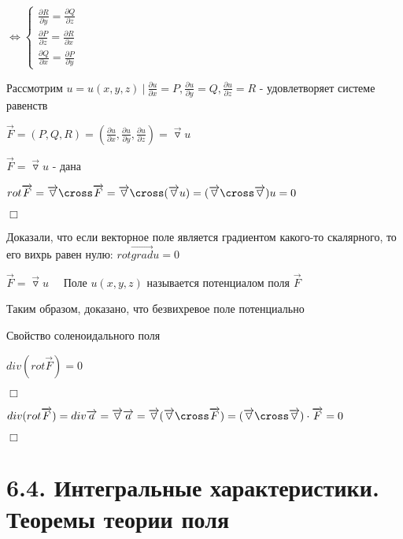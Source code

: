 \documentclass[12pt]{article}
\begin{document}
    $\Longleftrightarrow
    \begin{cases}
        \frac{\partial R}{\partial y} = \frac{\partial Q}{\partial z} \\
        \frac{\partial P}{\partial z} = \frac{\partial R}{\partial x} \\
        \frac{\partial Q}{\partial x} = \frac{\partial P}{\partial y}
    \end{cases}$

    Рассмотрим $u = u(x, y, z) \ | \ \frac{\partial u}{\partial x} = P, \frac{\partial u}{\partial y} = Q, \frac{\partial u}{\partial z} = R$ - удовлетворяет системе равенств

    $\overrightarrow{F} = (P, Q, R) = (\frac{\partial u}{\partial x}, \frac{\partial u}{\partial y}, \frac{\partial u}{\partial z}) = \overrightarrow{\triangledown} u$

    \fbox{\Longleftarrow} $\overrightarrow{F} = \overrightarrow{\triangledown}u$ - дана

    $rot \overrightarrow{F} = \overrightarrow{\triangledown} \cross \overrightarrow{F} = \overrightarrow{\triangledown} \cross (\overrightarrow{\triangledown} u) = (\overrightarrow{\triangledown} \cross \overrightarrow{\triangledown}) u = 0$

    $\Box$

    \Nota Доказали, что если векторное поле является градиентом какого-то скалярного, то его вихрь равен нулю: $rot \overrightarrow{grad} u = 0$

    \Def $\overrightarrow{F} = \overrightarrow{\triangledown} u \quad$ Поле $u(x, y, z)$ называется потенциалом поля $\overrightarrow{F}$

    Таким образом, доказано, что безвихревое поле потенциально

     Свойство соленоидального поля

    $div (rot \overrightarrow{F}) = 0$

    $\Box$

    $div (rot \overrightarrow{F}) = div \overrightarrow{a} = \overrightarrow{\triangledown} \overrightarrow{a} = \overrightarrow{\triangledown} (\overrightarrow{\triangledown} \cross \overrightarrow{F}) = (\overrightarrow{\triangledown} \cross \overrightarrow{\triangledown}) \cdot \overrightarrow{F} = 0$

    $\Box$

    \section{6.4. Интегральные характеристики. Теоремы теории поля}
\end{document}
